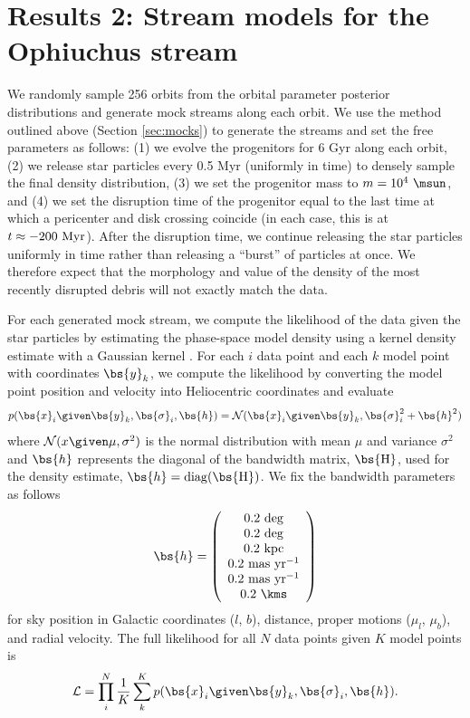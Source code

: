 \documentclass[letterpaper,12pt,preprint]{aastex}
\begin{document}
\section{Results 2: Stream models for the Ophiuchus stream}

We randomly sample 256 orbits from the orbital parameter posterior distributions and generate mock streams along each orbit. We use the method outlined above (Section \ref{sec:mocks}) to generate the streams and set the free parameters as follows: (1) we evolve the progenitors for 6 Gyr along each orbit, (2) we release star particles every 0.5 Myr (uniformly in time) to densely sample the final density distribution, (3) we set the progenitor mass to $m=10^4~\msun$, and (4) we set the disruption time of the progenitor equal to the last time at which a pericenter and disk crossing coincide (in each case, this is at $t \approx -200~{\rm Myr}$). After the disruption time, we continue releasing the star particles uniformly in time rather than releasing a ``burst'' of particles at once. We therefore expect that the morphology and value of the density of the most recently disrupted debris will not exactly match the data.

For each generated mock stream, we compute the likelihood of the data given the star particles by estimating the phase-space model density using a kernel density estimate with a Gaussian kernel \citep[see, e.g.,][]{bonaca14}. For each $i$ data point and each $k$ model point with coordinates $\bs{y}_k$, we compute the likelihood by converting the model point position and velocity into Heliocentric coordinates and evaluate
\begin{align}
	p(\bs{x}_i \given \bs{y}_k, \bs{\sigma}_i, \bs{h}) = \mathcal{N}(\bs{x}_i \given \bs{y}_k, \bs{\sigma}_i^2 +\bs{h}^2)
\end{align}
where $\mathcal{N}(x\given \mu,\sigma^2)$ is the normal distribution with mean $\mu$ and variance $\sigma^2$ and $\bs{h}$ represents the diagonal of the bandwidth matrix, $\bs{\rm H}$, used for the density estimate, $\bs{h} = {\rm diag}(\bs{\rm H})$. We fix the bandwidth parameters as follows
\begin{equation}
	\bs{h} = \left(
	\begin{array}{c}
	0.2~{\rm deg}\\
	0.2~{\rm deg}\\
	0.2~{\rm kpc}\\
	0.2~{\rm mas}~{\rm yr}^{-1}\\
	0.2~{\rm mas}~{\rm yr}^{-1}\\
	0.2~\kms
	\end{array}
	\right)
\end{equation} %
for sky position in Galactic coordinates ($l$, $b$), distance, proper motions ($\mu_l$, $\mu_b$), and radial velocity. The full likelihood for all $N$ data points given $K$ model points is 
\begin{equation}
	\mathcal{L} = \prod_i^N \frac{1}{K} \sum_k^K p(\bs{x}_i \given \bs{y}_k, \bs{\sigma}_i, \bs{h}).
\end{equation}
\end{document}
